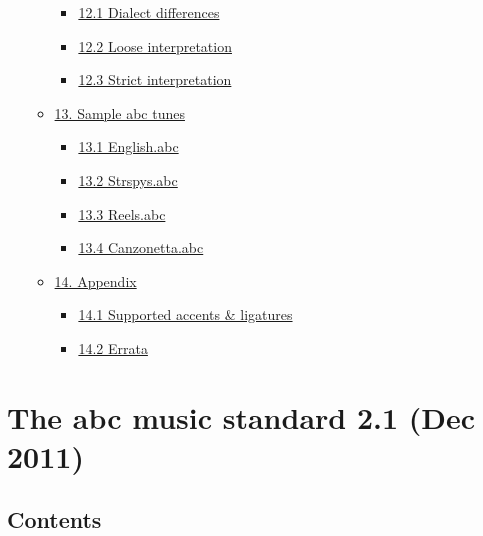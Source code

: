 \begin{itemize}
\begin{itemize}
    \begin{itemize}
    \item
      \protect\hyperlink{dialect_differences}{12.1 Dialect differences}
    \item
      \protect\hyperlink{loose_interpretation}{12.2 Loose
      interpretation}
    \item
      \protect\hyperlink{strict_interpretation}{12.3 Strict
      interpretation}
    \end{itemize}
  \item
    \protect\hyperlink{sample_abc_tunes}{13. Sample abc tunes}

    \begin{itemize}
    \item
      \protect\hyperlink{englishabc}{13.1 English.abc}
    \item
      \protect\hyperlink{strspysabc}{13.2 Strspys.abc}
    \item
      \protect\hyperlink{reelsabc}{13.3 Reels.abc}
    \item
      \protect\hyperlink{canzonettaabc}{13.4 Canzonetta.abc}
    \end{itemize}
  \item
    \protect\hyperlink{appendix}{14. Appendix}

    \begin{itemize}
    \item
      \protect\hyperlink{supported_accents_ligatures}{14.1 Supported
      accents \& ligatures}
    \item
      \protect\hyperlink{errata}{14.2 Errata}
    \end{itemize}
  \end{itemize}
\end{itemize}

\hypertarget{the_abc_music_standard_21_dec_2011}{\section{The abc music
standard 2.1 (Dec 2011)}\label{the_abc_music_standard_21_dec_2011}}

\hypertarget{contents}{\subsection{Contents}\label{contents}}

